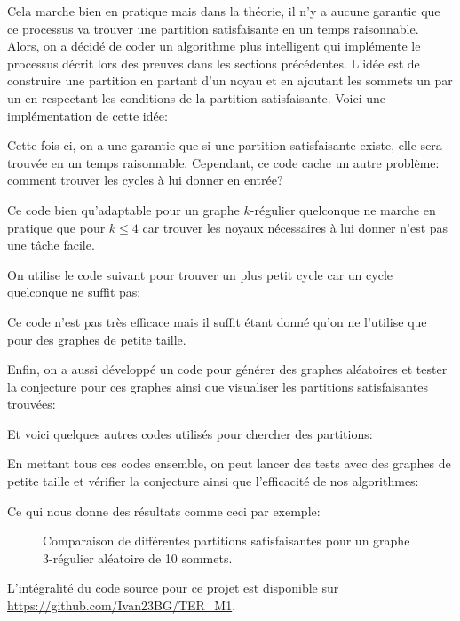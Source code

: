 
Cela marche bien en pratique mais dans la théorie, il n'y a aucune garantie que ce processus va trouver une partition satisfaisante en un temps raisonnable.
Alors, on a décidé de coder un algorithme plus intelligent qui implémente le processus décrit lors des preuves dans les sections précédentes.
L'idée est de construire une partition en partant d'un noyau et en ajoutant les sommets un par un en respectant les conditions de la partition satisfaisante.
Voici une implémentation de cette idée:


Cette fois-ci, on a une garantie que si une partition satisfaisante existe, elle sera trouvée en un temps raisonnable.
Cependant, ce code cache un autre problème: comment trouver les cycles à lui donner en entrée?

Ce code bien qu'adaptable pour un graphe \(k\)-régulier quelconque ne marche en pratique que pour \(k \leq 4\) car trouver les noyaux nécessaires à lui donner n'est pas une tâche facile.

On utilise le code suivant pour trouver un plus petit cycle car un cycle quelconque ne suffit pas:


Ce code n'est pas très efficace mais il suffit étant donné qu'on ne l'utilise que pour des graphes de petite taille.

Enfin, on a aussi développé un code pour générer des graphes aléatoires et tester la conjecture pour ces graphes ainsi que visualiser les partitions satisfaisantes trouvées:


Et voici quelques autres codes utilisés pour chercher des partitions:


En mettant tous ces codes ensemble, on peut lancer des tests avec des graphes de petite taille et vérifier la conjecture ainsi que l'efficacité de nos algorithmes:


Ce qui nous donne des résultats comme ceci par exemple:

\begin{figure}[H]
    \centering
    
    \caption{Comparaison de différentes partitions satisfaisantes pour un graphe 3-régulier aléatoire de 10 sommets.}\label{fig:partitions_comparison}
\end{figure}

L'intégralité du code source pour ce projet est disponible sur \url{https://github.com/Ivan23BG/TER_M1}.